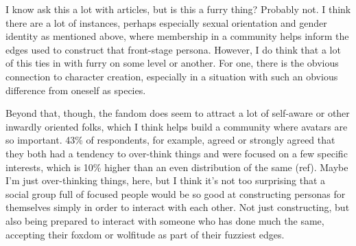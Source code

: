 I know ask this a lot with articles, but is this a furry thing?  Probably not.  I think there are a lot of instances, perhaps especially sexual orientation and gender identity as mentioned above, where membership in a community helps inform the edges used to construct that front-stage persona.  However, I do think that a lot of this ties in with furry on some level or another.  For one, there is the obvious connection to character creation, especially in a situation with such an obvious difference from oneself as species.

Beyond that, though, the fandom does seem to attract a lot of self-aware or other inwardly oriented folks, which I think helps build a community where avatars are so important.  43\% of respondents, for example, agreed or strongly agreed that they both had a tendency to over-think things and were focused on a few specific interests, which is 10\% higher than an even distribution of the same (ref).  Maybe I'm just over-thinking things, here, but I think it's not too surprising that a social group full of focused people would be so good at constructing personas for themselves simply in order to interact with each other.  Not just constructing, but also being prepared to interact with someone who has done much the same, accepting their foxdom or wolfitude as part of their fuzziest edges.
